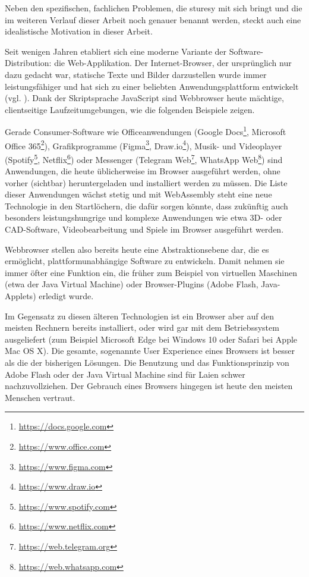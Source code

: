 Neben den spezifischen, fachlichen Problemen, die \ac{sturesy} mit sich bringt und die im weiteren Verlauf dieser Arbeit noch genauer benannt werden, steckt auch eine idealistische Motivation in dieser Arbeit.

Seit wenigen Jahren etabliert sich eine moderne Variante der Software-Distribution: die Web-Applikation. Der Internet-Browser, der ursprünglich nur dazu gedacht war, statische Texte und Bilder darzustellen wurde immer leistungsfähiger und hat sich zu einer beliebten Anwendungsplattform entwickelt (vgl. \cite[S. 1]{art:web1to4}). Dank der Skriptsprache JavaScript sind Webbrowser heute mächtige, clientseitige Laufzeitumgebungen, wie die folgenden Beispiele zeigen.

Gerade Consumer-Software wie Officeanwendungen (Google Docs\footnote{\url{https://docs.google.com}}, Microsoft Office 365\footnote{\url{https://www.office.com}}), Grafikprogramme (Figma\footnote{\url{https://www.figma.com}}, Draw.io\footnote{\url{https://www.draw.io}}), Musik- und Videoplayer (Spotify\footnote{\url{https://www.spotify.com}}, Netflix\footnote{\url{https://www.netflix.com}}) oder Messenger (Telegram Web\footnote{\url{https://web.telegram.org}}, WhatsApp Web\footnote{\url{https://web.whatsapp.com}}) sind Anwendungen, die heute üblicherweise im Browser ausgeführt werden, ohne vorher (sichtbar) heruntergeladen und installiert werden zu müssen. Die Liste dieser Anwendungen wächst stetig und mit WebAssembly steht eine neue Technologie in den Startlöchern, die dafür sorgen könnte, dass zukünftig auch besonders leistungshungrige und komplexe Anwendungen wie etwa 3D- oder CAD-Software, Videobearbeitung und Spiele im Browser ausgeführt werden.

Webbrowser stellen also bereits heute eine Abstraktionsebene dar, die es ermöglicht, plattformunabhängige Software zu entwickeln. Damit nehmen sie immer öfter eine Funktion ein, die früher zum Beispiel von virtuellen Maschinen (etwa der Java Virtual Machine) oder Browser-Plugins (Adobe Flash, Java-Applets) erledigt wurde.

Im Gegensatz zu diesen älteren Technologien ist ein Browser aber auf den meisten Rechnern bereits installiert, oder wird gar mit dem Betriebssystem ausgeliefert (zum Beispiel Microsoft Edge bei Windows 10 oder Safari bei Apple Mac OS X). Die gesamte, sogenannte User Experience eines Browsers ist besser als die der bisherigen Lösungen.
Die Benutzung und das Funktionsprinzip von Adobe Flash oder der Java Virtual Machine sind für Laien schwer nachzuvollziehen. Der Gebrauch eines Browsers hingegen ist heute den meisten Menschen vertraut.

